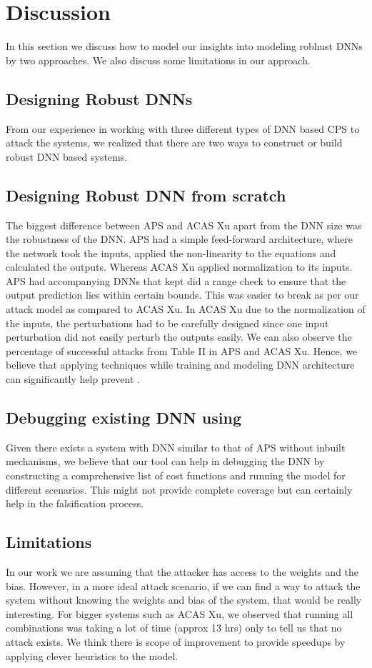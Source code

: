 \chapter{Discussion}
In this section we discuss how to model our insights into modeling robhust DNNs by two approaches. We also discuss some limitations in our approach.
\section{Designing Robust DNNs}
From our experience in working with three different types of DNN based CPS to attack the systems, we realized that there are two ways to construct or build robust DNN based systems. 
\section{Designing Robust DNN from scratch}
The biggest difference between APS and ACAS Xu apart from the DNN size was the robustness of the DNN. APS had a simple feed-forward architecture, where the network took the inputs, applied the non-linearity to the equations and calculated the outputs. Whereas ACAS Xu applied normalization to its inputs. 
APS had accompanying DNNs that kept did a range check to ensure that the output prediction lies within certain bounds. This was easier to break as per our attack model as compared to ACAS Xu. In ACAS Xu due to the normalization of the inputs, the perturbations had to be carefully designed since one input perturbation did not easily perturb the outputs easily. We can also observe the percentage of successful attacks from Table II in APS and ACAS Xu. Hence, we believe that applying techniques while training and modeling DNN architecture can significantly help prevent \attack. 
\section{Debugging existing DNN using \tool}
Given there exists a system with DNN similar to that of APS without inbuilt mechanisms, we believe that our tool can help in debugging the DNN by constructing a comprehensive list of cost functions and running the model for different scenarios. This might not provide complete coverage but can certainly help in the falsification process. 


\section{ Limitations}
In our work we are assuming that the attacker has access to the weights and the bias. However, in a more ideal attack scenario, if we can find a way to  attack the system without knowing the weights and bias of the system, that would be really interesting. %
For bigger systems such as ACAS Xu, we observed that running all combinations was taking a lot of time (approx 13 hrs) only to tell us that no attack exists. We think there is scope of improvement to provide speedups by applying clever heuristics to the model. 

